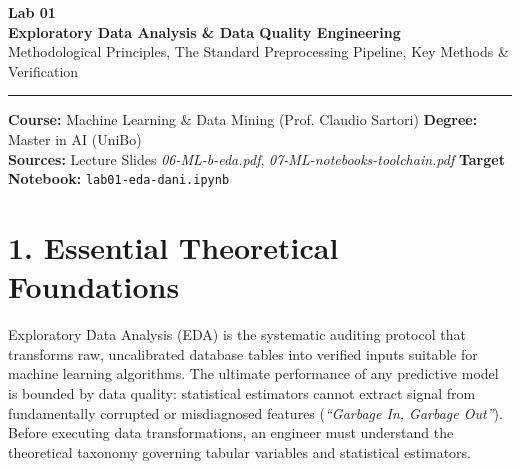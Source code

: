 \documentclass[11pt,a4paper]{article}
\let\oldtexttt\texttt
\renewcommand{\texttt}[1]{{\color{codebase}\oldtexttt{#1}}}
\begin{document}
{}

\begin{tcolorbox}[
    colback=blue!5!white,
    colframe=blue!65!black,
    arc=3mm,
    boxrule=1.2pt,
    left=14pt, right=14pt, top=12pt, bottom=12pt
]
    {\Huge\bfseries\color{blue!75!black} Lab 01}\\[0.3em]
    {\LARGE\bfseries Exploratory Data Analysis \& Data Quality Engineering}\\[0.4em]
    {\normalsize\textsf{Methodological Principles, The Standard Preprocessing Pipeline, Key Methods \& Verification}}\par
    \vspace{0.8em}
    \hrule
    \vspace{0.6em}
    \footnotesize
    \textbf{Course:} Machine Learning \& Data Mining (Prof. Claudio Sartori) \hfill \textbf{Degree:} Master in AI (UniBo)\\
    \textbf{Sources:} Lecture Slides \textit{06-ML-b-eda.pdf}, \textit{07-ML-notebooks-toolchain.pdf} \hfill \textbf{Target Notebook:} \texttt{lab01-eda-dani.ipynb}
\end{tcolorbox}
\vspace{0.5em}

{}
\section*{1. Essential Theoretical Foundations}

Exploratory Data Analysis (EDA) is the systematic auditing protocol that transforms raw, uncalibrated database tables into verified inputs suitable for machine learning algorithms. The ultimate performance of any predictive model is bounded by data quality: statistical estimators cannot extract signal from fundamentally corrupted or misdiagnosed features (\textit{``Garbage In, Garbage Out''}). Before executing data transformations, an engineer must understand the theoretical taxonomy governing tabular variables and statistical estimators.
\end{document}

